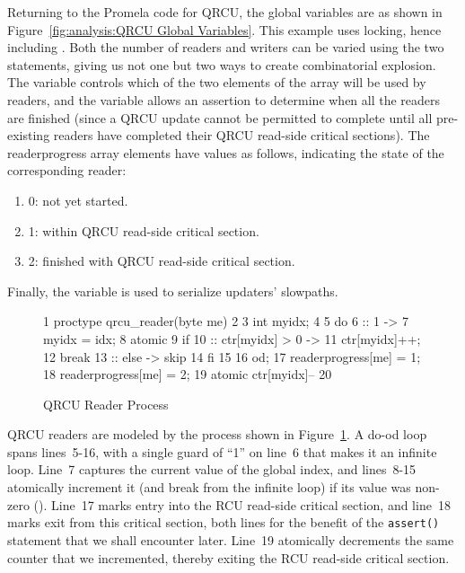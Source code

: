 Returning to the Promela code for QRCU, the global variables are as shown in
Figure~\ref{fig:analysis:QRCU Global Variables}.
This example uses locking, hence including .
Both the number of readers and writers can be varied using the
two  statements, giving us not one but two ways to create
combinatorial explosion.
The  variable controls which of the two elements of the 
array will be used by readers, and the  variable
allows an assertion to determine when all the readers are finished
(since a QRCU update cannot be permitted to complete until all
pre-existing readers have completed their QRCU read-side critical
sections).
The readerprogress array elements have values as follows,
indicating the state of the corresponding reader:

\begin{enumerate}
\item	0: not yet started.
\item	1: within QRCU read-side critical section.
\item	2: finished with QRCU read-side critical section.
\end{enumerate}

Finally, the  variable is used to serialize updaters' slowpaths.

\begin{figure}[htbp]
{ \scriptsize
\begin{verbbox}
  1 proctype qrcu_reader(byte me)
  2 {
  3   int myidx;
  4
  5   do
  6   :: 1 ->
  7     myidx = idx;
  8     atomic {
  9       if
 10       :: ctr[myidx] > 0 ->
 11         ctr[myidx]++;
 12         break
 13       :: else -> skip
 14       fi
 15     }
 16   od;
 17   readerprogress[me] = 1;
 18   readerprogress[me] = 2;
 19   atomic { ctr[myidx]-- }
 20 }
\end{verbbox}
}
\centering
\theverbbox
\caption{QRCU Reader Process}
\label{fig:analysis:QRCU Reader Process}
\end{figure}

QRCU readers are modeled by the  process shown in
Figure~\ref{fig:analysis:QRCU Reader Process}.
A do-od loop spans lines~5-16, with a single guard of ``1''
on line~6 that makes it an infinite loop.
Line~7 captures the current value of the global index, and lines~8-15
atomically increment it (and break from the infinite loop)
if its value was non-zero ().
Line~17 marks entry into the RCU read-side critical section, and
line~18 marks exit from this critical section, both lines for the benefit of
the {\tt assert()} statement that we shall encounter later.
Line~19 atomically decrements the same counter that we incremented,
thereby exiting the RCU read-side critical section.

